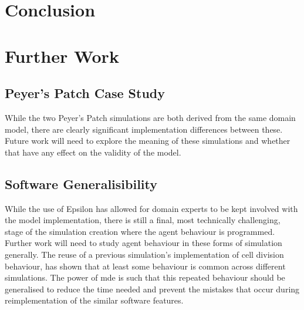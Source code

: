 \documentclass{UoYCSproject}
\begin{document}
\section{Conclusion}



\section{Further Work}
\subsection{Peyer's Patch Case Study}
While the two Peyer's Patch simulations are both derived from the same domain model, there are clearly significant implementation differences between these.
Future work will need to explore the meaning of these simulations and whether that have any effect on the validity of the model.


\subsection{Software Generalisibility}%
While the use of Epsilon has allowed for domain experts to be kept involved with the model implementation, there is still a final, most technically challenging, stage of the simulation creation where the agent behaviour is programmed.
Further work will need to study agent behaviour in these forms of simulation generally.
The reuse of a previous simulation's implementation of cell division behaviour, has shown that at least some behaviour is common across different simulations.
The power of \gls{mde} is such that this repeated behaviour should be generalised to reduce the time needed and prevent the mistakes that occur during reimplementation of the similar software features.
\end{document}
